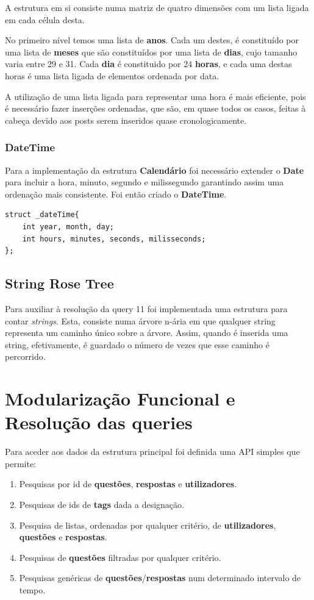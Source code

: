 \documentclass[10pt,a4paper]{article}
\begin{document}
        A estrutura em si consiste numa matriz de quatro dimensões com um lista
        ligada em cada célula desta.

        No primeiro nível temos uma lista de \textbf{anos}. Cada um destes,
        é constituído por uma lista de \textbf{meses} que são constituídos por
        uma lista de \textbf{dias}, cujo tamanho varia entre 29 e 31. Cada
        \textbf{dia} é constituido por 24 \textbf{horas}, e cada uma destas horas
        é uma lista ligada de elementos ordenada por data.

        A utilização de uma lista ligada para representar uma hora é mais
        eficiente, pois é necessário fazer inserções ordenadas, que são, em quase
        todos os casos, feitas à cabeça devido aos posts serem inseridos quase
        cronologicamente.

        \subsubsection{DateTime}
        Para a implementação da estrutura \textbf{Calendário} foi necessário
        extender o \textbf{Date} para incluir a hora, minuto, segundo e
        milissegundo garantindo assim uma ordenação mais consistente. Foi
        então criado o \textbf{DateTime}.
    \begin{verbatim}
struct _dateTime{
    int year, month, day;
    int hours, minutes, seconds, milisseconds;
};
    \end{verbatim}

    \subsection{String Rose Tree}
    \label{sec:str_rose_tree}
    Para auxiliar à resolução da query 11 foi implementada uma estrutura para
    contar \textit{strings}. Esta, consiste numa árvore n-ária em que qualquer
    string representa um caminho único sobre a árvore. Assim, quando é inserida
    uma string, efetivamente, é guardado o número de vezes que esse caminho é
    percorrido.

\section{Modularização Funcional e Resolução das queries}
    Para aceder aos dados da estrutura principal foi definida uma API
    simples que permite:
    \begin{enumerate}[1.]
        \item Pesquisas por id de \textbf{questões}, \textbf{respostas} e
        \textbf{utilizadores}.
        \item Pesquisas de ids de \textbf{tags} dada a designação.
        \item Pesquisa de listas, ordenadas por qualquer critério, de
        \textbf{utilizadores}, \textbf{questões} e \textbf{respostas}.
        \item Pesquisas de \textbf{questões} filtradas por qualquer critério.
        \item Pesquisas genéricas de \textbf{questões}/\textbf{respostas}
        num determinado intervalo de tempo.
    \end{enumerate}
\end{document}
